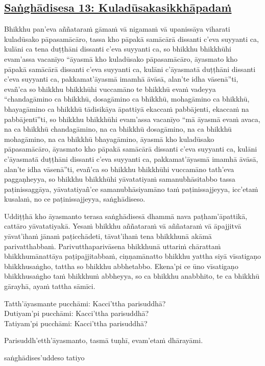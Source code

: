 \subsection*{\hyperref[comm13]{Saṅghādisesa 13: Kuladūsakasikkhāpadaṁ}}
\label{sd13}
Bhikkhu pan'eva aññataraṁ gāmaṁ vā nigamaṁ vā upanissāya viharati kuladūsako pāpasamācāro, tassa kho pāpakā samācārā dissanti c'eva suyyanti ca, kulāni ca tena duṭṭhāni dissanti c'eva suyyanti ca, so bhikkhu bhikkhūhi evam'assa vacanīyo “āyasmā kho kuladūsako pāpasamācāro, āyasmato kho pāpakā samācārā dissanti c'eva suyyanti ca, kulāni c'āyasmatā duṭṭhāni dissanti c'eva suyyanti ca, pakkamat'āyasmā imamhā āvāsā, alan'te idha vāsenā”ti, evañ'ca so bhikkhu bhikkhūhi vuccamāno te bhikkhū evaṁ vadeyya “chandagāmino ca bhikkhū, dosagāmino ca bhikkhū, mohagāmino ca bhikkhū, bhayagāmino ca bhikkhū tādisikāya āpattiyā ekaccaṁ pabbājenti, ekaccaṁ na pabbājentī”ti, so bhikkhu bhikkhūhi evam'assa vacanīyo “mā āyasmā evaṁ avaca, na ca bhikkhū chandagāmino, na ca bhikkhū dosagāmino, na ca bhikkhū mohagāmino, na ca bhikkhū bhayagāmino, āyasmā kho kuladūsako pāpasamācāro, āyasmato kho pāpakā samācārā dissanti c'eva suyyanti ca, kulāni c'āyasmatā duṭṭhāni dissanti c'eva suyyanti ca, pakkamat'āyasmā imamhā āvāsā, alan'te idha vāsenā”ti, evañ'ca so bhikkhu bhikkhūhi vuccamāno tath'eva paggaṇheyya, so bhikkhu bhikkhūhi yāvatatiyaṁ samanubhāsitabbo tassa paṭinissaggāya, yāvatatiyañ'ce samanubhāsiyamāno taṁ paṭinissajjeyya, icc'etaṁ kusalaṁ, no ce paṭinissajjeyya, saṅghādiseso.

\medskip

\begin{center}
Uddiṭṭhā kho āyasmanto terasa saṅghādisesā dhammā nava paṭham'āpattikā, cattāro yāvatatiyakā. Yesaṁ bhikkhu aññataraṁ vā aññataraṁ vā āpajjitvā yāvat'ihaṁ jānaṁ paṭicchādeti, tāvat'ihaṁ tena bhikkhunā akāmā parivatthabbaṁ. Parivutthaparivāsena bhikkhunā uttariṁ chārattaṁ bhikkhumānattāya paṭipajjitabbaṁ, ciṇṇamānatto bhikkhu yattha siyā vīsatigaṇo bhikkhusaṅgho, tattha so bhikkhu abbhetabbo. Ekena'pi ce ūno vīsatigaṇo bhikkhusaṅgho taṁ bhikkhuṁ abbheyya, so ca bhikkhu anabbhito, te ca bhikkhū gārayhā, ayaṁ tattha sāmīci.

\smallskip

Tatth'āyasmante pucchāmi: Kacci'ttha parisuddhā?\\
Dutiyam'pi pucchāmi: Kacci'ttha parisuddhā?\\
Tatiyam'pi pucchāmi: Kacci'ttha parisuddhā?

\smallskip

Parisuddh'etth'āyasmanto, tasmā tuṇhī, evam'etaṁ dhārayāmi.
\end{center}

\begin{outro}
  saṅghādises'uddeso tatiyo
\end{outro}

\clearpage
